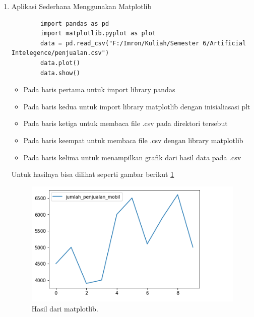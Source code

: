 \begin{enumerate}
\item Aplikasi Sederhana Menggunakan Matplotlib \par
	\begin{verbatim}
		import pandas as pd
		import matplotlib.pyplot as plot
		data = pd.read_csv("F:/Imron/Kuliah/Semester 6/Artificial Intelegence/penjualan.csv")
		data.plot()
		data.show()
	\end{verbatim}
\begin{itemize}
\item Pada baris pertama untuk import library pandas
\item Pada baris kedua untuk import library matplotlib dengan inisialiasasi plt
\item Pada baris ketiga untuk membaca file .csv pada direktori tersebut
\item Pada baris keempat untuk membaca file .csv dengan library matplotlib
\item Pada baris kelima untuk menampilkan grafik dari hasil data pada .csv
\end{itemize}
Untuk hasilnya bisa dilihat seperti gambar berikut \ref{ron3}
		\begin{figure}[ht]
		\centerline{\includegraphics[width=1\textwidth]{figures/im/ron3.png}}
		\caption{Hasil dari matplotlib.}
		\label{ron3}
		\end{figure}


\end{enumerate}
